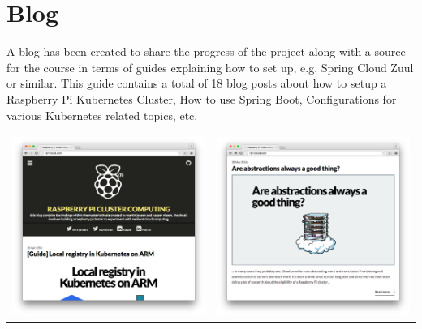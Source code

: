 \section*{Blog}

A blog has been created to share the progress of the project along with a source for the course in terms of guides explaining how to set up, e.g. Spring Cloud Zuul or similar. This guide contains a total of 18 blog posts about how to setup a Raspberry Pi Kubernetes Cluster, How to use Spring Boot, Configurations for various Kubernetes related topics, etc.

\renewcommand*{\arraystretch}{2}
\begin{tabular}{p{7cm}p{7cm}}
\centering
\includegraphics[align=t,width=7cm]{figures/blog/blog4} & \includegraphics[align=t,width=7cm]{figures/blog/blog1} \\
\end{tabular}

